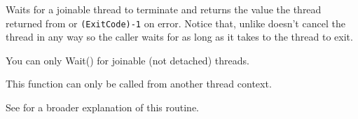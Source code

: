 \label{wxthreadwait}


Waits for a joinable thread to terminate and returns the value the thread
returned from  or {\tt (ExitCode)-1} on
error. Notice that, unlike  doesn't cancel the
thread in any way so the caller waits for as long as it takes to the thread to
exit.

You can only Wait() for joinable (not detached) threads.

This function can only be called from another thread context.

See  for a broader explanation of this routine.


